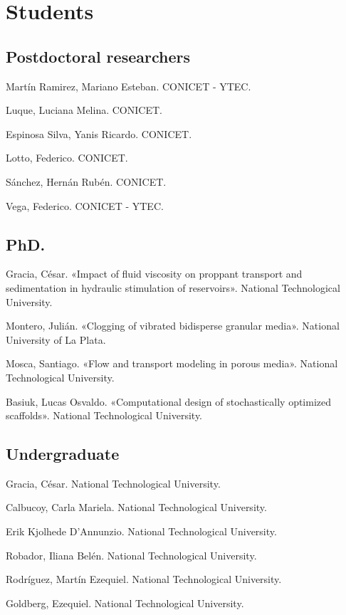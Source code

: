 \section{Students}

\subsection{Postdoctoral researchers}
     Martín Ramirez, Mariano Esteban. CONICET - YTEC.

     Luque, Luciana Melina. CONICET. 

     Espinosa Silva, Yanis Ricardo. CONICET. 

     Lotto, Federico. CONICET.

     Sánchez, Hernán Rubén. CONICET.

     Vega, Federico. CONICET - YTEC.

\subsection{PhD.}

 Gracia, César. «Impact of fluid viscosity on proppant transport and sedimentation in hydraulic stimulation of reservoirs». National Technological University.

 Montero, Julián. «Clogging of vibrated bidisperse granular media». National University of La Plata.

 Mosca, Santiago. «Flow and transport modeling in porous media». National Technological University.

 Basiuk, Lucas Osvaldo. «Computational design of stochastically optimized scaffolds». National Technological University.

\subsection{Undergraduate}


     Gracia, César. National Technological University.

     Calbucoy, Carla Mariela. National Technological University.

     Erik Kjolhede D'Annunzio. National Technological University.

     Robador, Iliana Belén. National Technological University.

     Rodríguez, Martín Ezequiel. National Technological University.

     Goldberg, Ezequiel. National Technological University.


